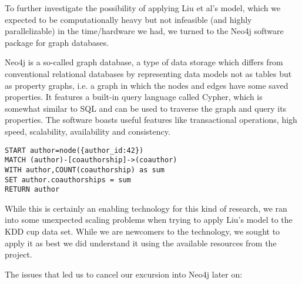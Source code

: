 To further investigate the possibility of applying Liu et al’s model, which we expected to be computationally heavy but not infeasible (and highly parallelizable) in the time/hardware we had, we turned to the Neo4j software package for graph databases.

Neo4j is a so-called graph database, a type of data storage which differs from conventional relational databases by representing data models not as tables but as property graphs, i.e. a graph in which the nodes and edges have some saved properties. It features a built-in query language called Cypher, which is somewhat similar to SQL and can be used to traverse the graph and query its properties.
The software boasts useful features like transactional operations, high speed, scalability, availability and consistency.

\begin{verbatim}
START author=node({author_id:42})
MATCH (author)-[coauthorship]->(coauthor)
WITH author,COUNT(coauthorship) as sum
SET author.coauthorships = sum
RETURN author
\end{verbatim}

While this is certainly an enabling technology for this kind of research, we ran into some unexpected scaling problems when trying to apply Liu’s model to the KDD cup data set.
While we are newcomers to the technology, we sought to apply it as best we did understand it using the available resources from the project.

The issues that led us to cancel our excursion into Neo4j later on:

